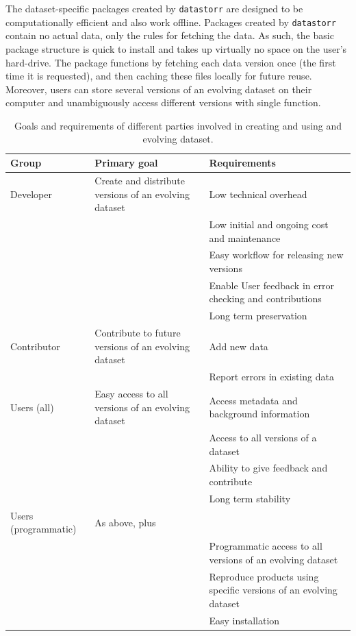 \documentclass[a4paper,num-refs]{assets/oup-contemporary}
\begin{document}
The dataset-specific packages created by \texttt{datastorr} are designed to be computationally efficient and also work offline. Packages created by \texttt{datastorr} contain no actual data, only the rules for fetching the data. As such, the basic package structure is quick to install and takes up virtually no space on the user's hard-drive. The package functions by fetching each data version once (the first time it is requested), and then caching these files locally for future reuse. Moreover, users can store several versions of an evolving dataset on their computer and unambiguously access different versions with single function.

\begin{table}[t!]
\centering
\caption{Goals and requirements of different parties involved in creating and using and evolving dataset.}
\vspace{0.2cm}
  \begin{tabular}{p{3cm}p{5cm}p{8cm}}
  \hline
  \textbf{Group} & \textbf{Primary goal} & \textbf{Requirements} \\ \hline
  Developer & Create and distribute versions of an evolving dataset & Low technical overhead \\
    & & Low initial and ongoing cost and maintenance \\
    & & Easy workflow for releasing new versions \\
    & & Enable User feedback in error checking and contributions \\
    & & Long term preservation \\
  Contributor & Contribute to future versions of an evolving dataset & Add new data \\
    & & Report errors in existing data \\
  Users (all) & Easy access to all versions of an evolving dataset & Access metadata and background information\\
    & & Access to all versions of a dataset\\
    & & Ability to give feedback and contribute \\
    & & Long term stability \\
  Users (programmatic) &  As above, plus\\
    & & Programmatic access to all versions of an evolving dataset \\
    & & Reproduce products using specific versions of an evolving dataset \\
    & & Easy installation \\
  \hline
  \end{tabular}
\label{tab:user_requirements}
\end{table}
\end{document}
